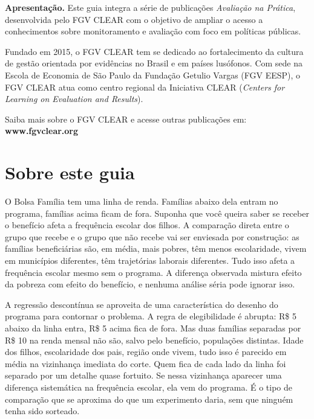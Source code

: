 \documentclass[12pt, a4paper, openany]{book}
\begin{document}
\vspace{1cm}

\noindent\textbf{Apresenta\c{c}\~ao.} Este guia integra a s\'erie de publica\c{c}\~oes \textit{Avalia\c{c}\~ao na Pr\'atica}, desenvolvida pelo FGV CLEAR com o objetivo de ampliar o acesso a conhecimentos sobre monitoramento e avalia\c{c}\~ao com foco em pol\'iticas p\'ublicas.

Fundado em 2015, o FGV CLEAR tem se dedicado ao fortalecimento da cultura de gest\~ao orientada por evid\^encias no Brasil e em pa\'ises lus\'ofonos. Com sede na Escola de Economia de S\~ao Paulo da Funda\c{c}\~ao Getulio Vargas (FGV EESP), o FGV CLEAR atua como centro regional da Iniciativa CLEAR (\textit{Centers for Learning on Evaluation and Results}).

Saiba mais sobre o FGV CLEAR e acesse outras publica\c{c}\~oes em: \textbf{www.fgvclear.org}
\newpage

\thispagestyle{empty}
\section*{Sobre este guia}
O Bolsa Família tem uma linha de renda. Famílias abaixo dela entram no
programa, famílias acima ficam de fora. Suponha que você queira saber se
receber o benefício afeta a frequência escolar dos filhos. A comparação
direta entre o grupo que recebe e o grupo que não recebe vai ser enviesada
por construção: as famílias beneficiárias são, em média, mais pobres, têm
menos escolaridade, vivem em municípios diferentes, têm trajetórias
laborais diferentes. Tudo isso afeta a frequência escolar mesmo sem o
programa. A diferença observada mistura efeito da pobreza com efeito do
benefício, e nenhuma análise séria pode ignorar isso.

A regressão descontínua se aproveita de uma característica do desenho do
programa para contornar o problema. A regra de elegibilidade é abrupta:
R\$ 5 abaixo da linha entra, R\$ 5 acima fica de fora. Mas duas famílias
separadas por R\$ 10 na renda mensal não são, salvo pelo benefício,
populações distintas. Idade dos filhos, escolaridade dos pais, região onde
vivem, tudo isso é parecido em média na vizinhança imediata do corte. Quem
fica de cada lado da linha foi separado por um detalhe quase fortuito. Se
nessa vizinhança aparecer uma diferença sistemática na frequência escolar,
ela vem do programa. É o tipo de comparação que se aproxima do que um
experimento daria, sem que ninguém tenha sido sorteado.
\end{document}
